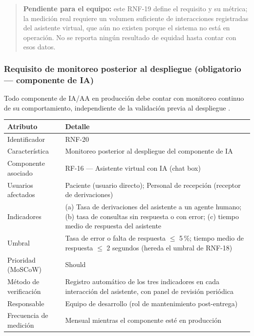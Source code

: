 \documentclass[11pt,a4paper]{article}
\begin{document}
	\begin{quote}
		\textbf{Pendiente para el equipo:} este RNF-19 define el requisito y su métrica; la medición real requiere un volumen suficiente de interacciones registradas del asistente virtual, que aún no existen porque el sistema no está en operación. No se reporta ningún resultado de equidad hasta contar con esos datos.
	\end{quote}
	
	\subsubsection{ Requisito de monitoreo posterior al despliegue (obligatorio --- componente de IA)}
	
	Todo componente de IA/AA en producción debe contar con monitoreo continuo de su comportamiento, independiente de la validación previa al despliegue \cite{whoai2021,euaiact2024}.
	
	\begin{longtable}{p{} p{}}
		
		\toprule
		\textbf{Atributo} & \textbf{Detalle} \\
		\midrule
		\endhead
		
		Identificador & RNF-20 \\
		Característica & Monitoreo posterior al despliegue del componente de IA \\
		Componente asociado & RF-16 --- Asistente virtual con IA (chat box) \\
		Usuarios afectados & Paciente (usuario directo); Personal de recepción (receptor de derivaciones) \\
		Indicadores & (a) Tasa de derivaciones del asistente a un agente humano; (b) tasa de consultas sin respuesta o con error; (c) tiempo medio de respuesta del asistente \\
		Umbral & Tasa de error o falta de respuesta \(\leq\) 5\,\%; tiempo medio de respuesta \(\leq\) 2 segundos (hereda el umbral de RNF-18) \\
		Prioridad (MoSCoW) & Should \\
		Método de verificación & Registro automático de los tres indicadores en cada interacción del asistente, con panel de revisión periódica \\
		Responsable & Equipo de desarrollo (rol de mantenimiento post-entrega) \\
		Frecuencia de medición & Mensual mientras el componente esté en producción \\
		\bottomrule
	\end{longtable}
	
\end{document}

